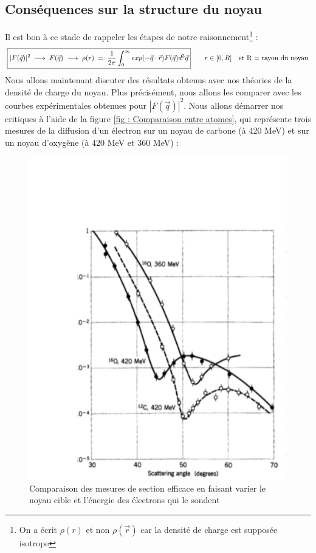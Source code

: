     \subsection{Conséquences sur la structure du noyau}


Il est bon à ce stade de rappeler les étapes de notre raisonnement\footnote{On a écrit $\rho(r)$ et non $\rho(\vec{r})$ car la densité de charge est supposée isotrope} : 
\begin{equation*}
\boxed{
    |F(\vec{q})|^2 \; \longrightarrow \; F(\vec{q}) \; \longrightarrow \; \rho(r) \; = \; \dfrac{1}{2\pi} \int_0^{\infty} exp(-\vec{q}\cdot \vec{r})
    F(\vec{q}) d^3\vec{q}
}
    \qquad r \in [0,R] \quad \text{et R = rayon du noyau}
\end{equation*}
Nous allons maintenant discuter des résultats obtenus avec nos théories de la densité de charge du noyau. Plus précisément, nous allons les comparer avec les courbes expérimentales obtenues pour $|F(\vec{q})|^2$. Nous allons démarrer nos critiques à l'aide de la figure \eqref{fig : Comparaison entre atomes}, qui représente trois mesures de la diffusion d'un électron sur un noyau de carbone (à 420 MeV) et sur un noyau d'oxygène (à 420 MeV et 360 MeV) :
\begin{figure}[H]
    \centering
    \includegraphics[scale=0.80]{Images4/ComparaisonAtomes.PNG}
    \caption{Comparaison des mesures de section efficace en faisant varier le noyau cible et l'énergie des électrons qui le sondent}
    \label{fig : Comparaison entre atomes}
\end{figure}

